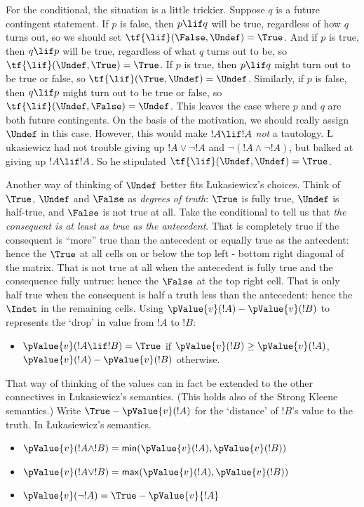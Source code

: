 \documentclass[../../../include/open-logic-section]{subfiles}
\begin{document}
For the conditional, the situation is a little trickier. Suppose $q$
is a future contingent statement. If $p$ is false, then $p \lif q$
will be true, regardless of how $q$ turns out, so we should set
$\tf{\lif}(\False, \Undef) = \True$. And if $p$ is true, then
$q \lif p$ will be true, regardless of what $q$ turns out to be, so
$\tf{\lif}(\Undef, \True) = \True$. If $p$ is true, then $p
\lif q$ might turn out to be true or false, so $\tf{\lif}(\True,
\Undef) = \Undef$. Similarly, if $p$ is false, then $q
\lif p$ might turn out to be true or false, so
$\tf{\lif}(\Undef, \False) = \Undef$. This leaves the
case where $p$ and $q$ are both future contingents. On the basis of
the motivation, we should really assign $\Undef$ in this case.
However, this would make $!A \lif !A$ \emph{not} a tautology. \L
ukasiewicz had not trouble giving up $!A \lor \lnot !A$ and $\lnot(!A
\land \lnot !A)$, but balked at giving up $!A \lif !A$. So he
stipulated $\tf{\lif}(\Undef, \Undef) =
\True$.

Another way of thinking of $\Undef$ better fits \L ukasiewicz's choices.
Think of $\True$, $\Undef$ and $\False$ as \emph{degrees of truth}: $\True$ 
is fully true, $\Undef$ is half-true, and $\False$ is not true at all.
Take the conditional to tell us that \emph{the 
 consequent is at least as true as the antecedent}. That is completely 
 true if the consequent is ``more'' true than the antecedent or equally 
 true as the antecdent: hence the $\True$ at all cells on or below the 
 top left - bottom right diagonal of the matrix. That is not true at
 all when the antecedent is fully true and the consequence fully untrue: hence 
  the $\False$ at the top right cell. That is only half true when the 
  consequent is half a truth less than the antecedent: hence the $\Indet$ 
  in the remaining cells. Using $\pValue{v}(!A) - \pValue{v}(!B)$ to 
  represents the `drop' in value from $!A$ to $!B$:
  \begin{itemize}
    \item $\pValue{v}(!A \lif !B) = \True$ if $\pValue{v}(!B) \geq \pValue{v}(!A)$,
    $\pValue{v}(!A) - \pValue{v}(!B)$ otherwise.
  \end{itemize}

That way of thinking of the values can in fact be extended to the other
connectives in \L ukasiewicz's semantics. (This holds also of the Strong
Kleene semantics.) Write $\True - \pValue{v}(!A)$ for the `distance' of 
$!B$'s value to the truth. In \L ukasiewicz's semantics.
\begin{itemize}
  \item $\pValue{v}(!A \land !B) = \mathsf{min}(\pValue{v}(!A),\pValue{v}(!B))$
  \item $\pValue{v}(!A \lor !B) = \mathsf{max}(\pValue{v}(!A),\pValue{v}(!B))$
  \item $\pValue{v}(\lnot !A) = \True - \pValue{v}{!A}$ 
\end{itemize}
\end{document}
